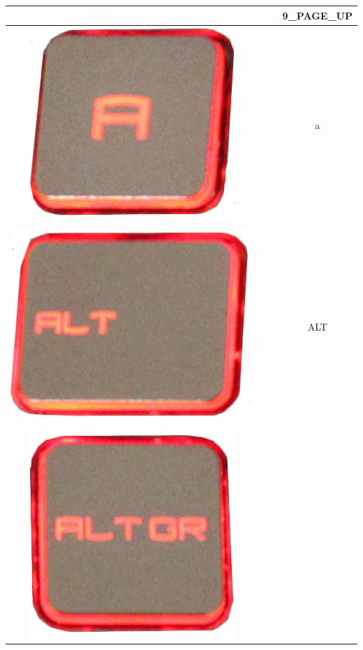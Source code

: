 \begin{longtable}{cccc}
\begin{minipage}[c]{.3\textwidth}
\vspace{0.2cm}
\end{minipage} & & & 9\_PAGE\_UP\\
\hline
\begin{minipage}[c]{.3\textwidth}
\vspace{0.2cm}
\includegraphics[scale=0.1]{Images/KeyMapping/a}
\vspace{0.2cm}
\end{minipage} & & & a\\
\hline
\begin{minipage}[c]{.3\textwidth}
\vspace{0.2cm}
\includegraphics[scale=0.1]{Images/KeyMapping/ALT}
\vspace{0.2cm}
\end{minipage} & & & ALT\\
\hline
\begin{minipage}[c]{.3\textwidth}
\vspace{0.2cm}
\includegraphics[scale=0.1]{Images/KeyMapping/ALT_GR}

\end{minipage}
\end{longtable}
